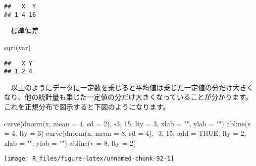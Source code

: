 \documentclass[
  12pt,
]{book}
\newenvironment{Shaded}{\begin{snugshade}}{\end{snugshade}}
\newcommand{\AttributeTok}[1]{\textcolor[rgb]{0.77,0.63,0.00}{#1}}
\newcommand{\ConstantTok}[1]{\textcolor[rgb]{0.00,0.00,0.00}{#1}}
\newcommand{\DecValTok}[1]{\textcolor[rgb]{0.00,0.00,0.81}{#1}}
\newcommand{\FunctionTok}[1]{\textcolor[rgb]{0.00,0.00,0.00}{#1}}
\newcommand{\NormalTok}[1]{#1}
\newcommand{\SpecialCharTok}[1]{\textcolor[rgb]{0.00,0.00,0.00}{#1}}
\newcommand{\StringTok}[1]{\textcolor[rgb]{0.31,0.60,0.02}{#1}}
\begin{document}
\begin{verbatim}
##   X  Y
## 1 4 16
\end{verbatim}

　標準偏差

\begin{Shaded}
\begin{Highlighting}[]
\FunctionTok{sqrt}\NormalTok{(var)}
\end{Highlighting}
\end{Shaded}

\begin{verbatim}
##   X Y
## 1 2 4
\end{verbatim}

　以上のようにデータに一定数を乗じると平均値は乗じた一定値の分だけ大きくなり、他の統計量も乗じた一定値の分だけ大きくなっていることが分かります。これを正規分布で図示すると下図のようになります。

\begin{Shaded}
\begin{Highlighting}[]
\FunctionTok{curve}\NormalTok{(}\FunctionTok{dnorm}\NormalTok{(x, }\AttributeTok{mean =} \DecValTok{4}\NormalTok{, }\AttributeTok{sd =} \DecValTok{2}\NormalTok{), }\SpecialCharTok{{-}}\DecValTok{3}\NormalTok{, }\DecValTok{15}\NormalTok{, }\AttributeTok{lty =} \DecValTok{3}\NormalTok{, }\AttributeTok{xlab =} \StringTok{""}\NormalTok{, }\AttributeTok{ylab =} \StringTok{""}\NormalTok{)}
\FunctionTok{abline}\NormalTok{(}\AttributeTok{v =} \DecValTok{4}\NormalTok{, }\AttributeTok{lty =} \DecValTok{3}\NormalTok{)}
\FunctionTok{curve}\NormalTok{(}\FunctionTok{dnorm}\NormalTok{(x, }\AttributeTok{mean =} \DecValTok{8}\NormalTok{, }\AttributeTok{sd =} \DecValTok{4}\NormalTok{), }\SpecialCharTok{{-}}\DecValTok{3}\NormalTok{, }\DecValTok{15}\NormalTok{, }\AttributeTok{add =} \ConstantTok{TRUE}\NormalTok{, }\AttributeTok{lty =} \DecValTok{2}\NormalTok{,}
      \AttributeTok{xlab =} \StringTok{""}\NormalTok{, }\AttributeTok{ylab =} \StringTok{""}\NormalTok{)}
\FunctionTok{abline}\NormalTok{(}\AttributeTok{v =} \DecValTok{8}\NormalTok{, }\AttributeTok{lty =} \DecValTok{2}\NormalTok{)}
\end{Highlighting}
\end{Shaded}

\begin{center}\texttt{[image: R\_files/figure-latex/unnamed-chunk-92-1]} \end{center}

　
\end{document}
